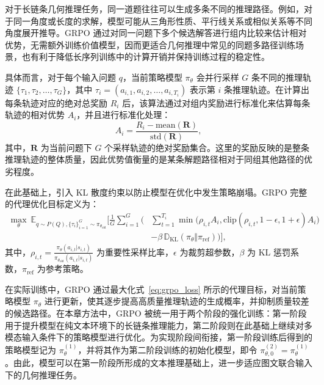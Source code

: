 对于长链条几何推理任务，同一道题往往可以生成多条不同的推理路径。例如，对于同一角度或长度的求解，模型可能从三角形性质、平行线关系或相似关系等不同角度展开推导。GRPO 通过对同一问题下多个候选解答进行组内比较来估计相对优势，无需额外训练价值模型，因而更适合几何推理中常见的同题多路径训练场景，也有利于降低长序列训练中的计算开销并保持训练过程的稳定性。

具体而言，对于每个输入问题 $q$，当前策略模型 $\pi_{\theta}$ 会并行采样 $G$ 条不同的推理轨迹 $\{\tau_1, \tau_2, \dots, \tau_G\}$，其中 $\tau_i=(a_{i,1},a_{i,2},\dots,a_{i,T_i})$ 表示第 $i$ 条推理轨迹。在计算出每条轨迹对应的绝对总奖励 $R_i$ 后，该算法通过对组内奖励进行标准化来估算每条轨迹的相对优势 $A_i$，并且进行标准化处理：
\begin{equation}
  A_i = \frac{R_i - \text{mean}(\mathbf{R})}{\text{std}(\mathbf{R})},
\end{equation}
其中，$\mathbf{R}$ 为当前问题下 $G$ 个采样轨迹的绝对奖励集合。这里的奖励反映的是整条推理轨迹的整体质量，因此优势值衡量的是某条解题路径相对于同组其他路径的优劣程度。

在此基础上，引入 KL 散度约束以防止模型在优化中发生策略崩塌。GRPO 完整的代理优化目标定义为：
\begin{equation} \label{eq:grpo_loss}
  \begin{aligned}
    \max_{\theta}\ \mathbb{E}_{q \sim P(Q), \{\tau_i\}_{i=1}^G \sim \pi_{\theta_{\text{old}}}} \Bigg[ \frac{1}{G} \sum_{i=1}^G \Bigg( & \sum_{t=1}^{T_i} \min \Big( \rho_{i,t} A_i, \text{clip}(\rho_{i,t}, 1-\epsilon, 1+\epsilon) A_i \Big) \\
                                                                                                                                      & - \beta\, \mathbb{D}_{\mathrm{KL}}(\pi_{\theta} \Vert \pi_{\mathrm{ref}}) \Bigg) \Bigg],
  \end{aligned}
\end{equation}
其中，$\rho_{i,t} = \frac{\pi_\theta(a_{i,t}|s_{i,t})}{\pi_{\theta_{\text{old}}}(a_{i,t}|s_{i,t})}$ 为重要性采样比率，$\epsilon$ 为裁剪超参数，$\beta$ 为 KL 惩罚系数，$\pi_{\mathrm{ref}}$ 为参考策略。

在实际训练中，GRPO 通过最大化式~\eqref{eq:grpo_loss} 所示的代理目标，对当前策略模型 $\pi_{\theta}$ 进行更新，使其逐步提高高质量推理轨迹的生成概率，并抑制质量较差的候选路径。在本章方法中，GRPO 被统一用于两个阶段的强化训练：第一阶段用于提升模型在纯文本环境下的长链条推理能力，第二阶段则在此基础上继续对多模态输入条件下的策略模型进行优化。为实现阶段间衔接，第一阶段训练后得到的策略模型记为 $\pi_{\theta}^{(1)}$，并将其作为第二阶段训练的初始化模型，即令 $\pi_{\theta,0}^{(2)}=\pi_{\theta}^{(1)}$。由此，模型可以在第一阶段所形成的文本推理基础上，进一步适应图文联合输入下的几何推理任务。


